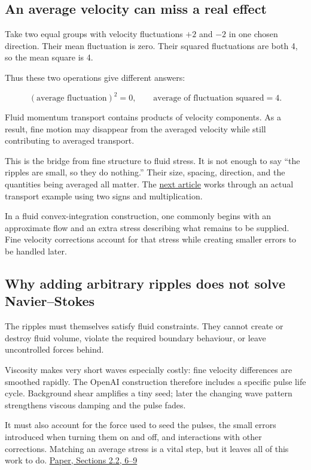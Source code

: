 \documentclass[
  english,
  11pt,
]{article}
\begin{document}
\subsection{An average velocity can miss a real
effect}\label{an-average-velocity-can-miss-a-real-effect}

Take two equal groups with velocity fluctuations \(+2\) and \(-2\) in
one chosen direction. Their mean fluctuation is zero. Their squared
fluctuations are both 4, so the mean square is 4.

Thus these two operations give different answers:

\[
(\text{average fluctuation})^2=0,
\qquad
\text{average of fluctuation squared}=4.
\]

Fluid momentum transport contains products of velocity components. As a
result, fine motion may disappear from the averaged velocity while still
contributing to averaged transport.

This is the bridge from fine structure to fluid stress. It is not enough
to say ``the ripples are small, so they do nothing.'' Their size,
spacing, direction, and the quantities being averaged all matter. The
\href{../d4_mean_stress/article.html}{next article} works through an
actual transport example using two signs and multiplication.

In a fluid convex-integration construction, one commonly begins with an
approximate flow and an extra stress describing what remains to be
supplied. Fine velocity corrections account for that stress while
creating smaller errors to be handled later.

\subsection{Why adding arbitrary ripples does not solve
Navier--Stokes}\label{why-adding-arbitrary-ripples-does-not-solve-navierstokes}

The ripples must themselves satisfy fluid constraints. They cannot
create or destroy fluid volume, violate the required boundary behaviour,
or leave uncontrolled forces behind.

Viscosity makes very short waves especially costly: fine velocity
differences are smoothed rapidly. The OpenAI construction therefore
includes a specific pulse life cycle. Background shear amplifies a tiny
seed; later the changing wave pattern strengthens viscous damping and
the pulse fades.

It must also account for the force used to seed the pulses, the small
errors introduced when turning them on and off, and interactions with
other corrections. Matching an average stress is a vital step, but it
leaves all of this work to do.
\href{https://cdn.openai.com/pdf/32d9f210-8b73-45e0-91bc-82a30aef8a9a/navier-stokes.pdf}{Paper,
Sections 2.2, 6--9}
\end{document}
